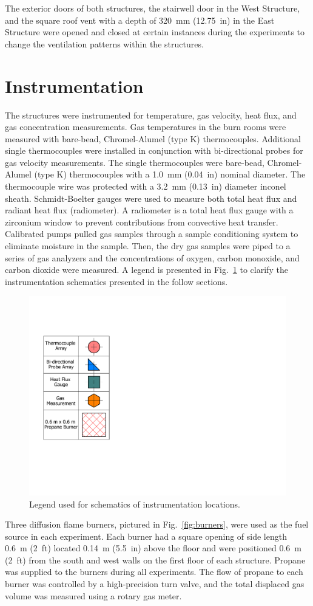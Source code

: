 \documentclass[12pt,oneside]{book}
\begin{document}
The exterior doors of both structures, the stairwell door in the West Structure, and the square roof vent with a depth of 320~mm (12.75~in) in the East Structure were opened and closed at certain instances during the experiments to change the ventilation patterns within the structures.

\section{Instrumentation}
\label{sec:Instrumentation}
The structures were instrumented for temperature, gas velocity, heat flux, and gas concentration measurements. Gas temperatures in the burn rooms were measured with bare-bead, Chromel-Alumel (type K) thermocouples. Additional single thermocouples were installed in conjunction with bi-directional probes for gas velocity measurements. The single thermocouples were bare-bead, Chromel-Alumel (type K) thermocouples with a 1.0~mm (0.04~in) nominal diameter. The thermocouple wire was protected with a 3.2~mm (0.13~in) diameter inconel sheath. Schmidt-Boelter gauges were used to measure both total heat flux and radiant heat flux (radiometer). A radiometer is a total heat flux gauge with a zirconium window to prevent contributions from convective heat transfer. Calibrated pumps pulled gas samples through a sample conditioning system to eliminate moisture in the sample. Then, the dry gas samples were piped to a series of gas analyzers and the concentrations of oxygen, carbon monoxide, and carbon dioxide were measured. A legend is presented in Fig.~\ref{fig:Instrumentation_Legend} to clarify the instrumentation schematics presented in the follow sections.

\begin{figure}[!ht]
	\includegraphics[width=0.25\columnwidth]{../Figures/Floor_Plans/Instrumentation_Legend}
	\caption[Instrumentation legend.]{Legend used for schematics of instrumentation locations.}
	\label{fig:Instrumentation_Legend}
\end{figure}

Three diffusion flame burners, pictured in Fig.~\ref{fig:burners}, were used as the fuel source in each experiment. Each burner had a square opening of side length 0.6~m (2~ft) located 0.14~m (5.5~in) above the floor and were positioned 0.6~m (2~ft) from the south and west walls on the first floor of each structure. Propane was supplied to the burners during all experiments. The flow of propane to each burner was controlled by a high-precision turn valve, and the total displaced gas volume was measured using a rotary gas meter.
\end{document}
